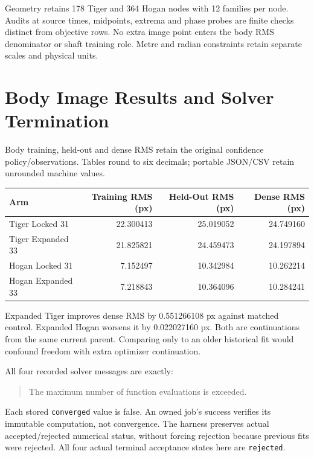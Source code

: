 \documentclass[11pt,letterpaper]{article}
\newcommand{\code}[1]{\nolinkurl{#1}}\newcommand{\hash}[1]{{\footnotesize\nolinkurl{#1}}}
\newcommand{\chapterpage}[1]{\par\clearpage\section{#1}}
\begin{document}
Geometry retains 178 Tiger and 364 Hogan nodes with 12 families per node.
Audits at source times, midpoints, extrema and phase probes are finite checks distinct from objective rows.
No extra image point enters the body RMS denominator or shaft training role.
Metre and radian constraints retain separate scales and physical units.
\chapterpage{Body Image Results and Solver Termination}
Body training, held-out and dense RMS retain the original confidence policy/observations.
Tables round to six decimals; portable JSON/CSV retain unrounded machine values.
\par\smallskip
\begin{tabular}{@{}lrrr@{}}\toprule
Arm & Training RMS (px) & Held-Out RMS (px) & Dense RMS (px)\\\midrule
Tiger Locked 31 & 22.300413 & 25.019052 & 24.749160 \\
Tiger Expanded 33 & 21.825821 & 24.459473 & 24.197894 \\
Hogan Locked 31 & 7.152497 & 10.342984 & 10.262214 \\
Hogan Expanded 33 & 7.218843 & 10.364096 & 10.284241 \\
\bottomrule\end{tabular}\par\smallskip

Expanded Tiger improves dense RMS by 0.551266108 px against matched control.
Expanded Hogan worsens it by 0.022027160 px. Both are continuations from the same current parent.
Comparing only to an older historical fit would confound freedom with extra optimizer continuation.

All four recorded solver messages are exactly:
\begin{quote}\ttfamily The maximum number of function evaluations is exceeded.\end{quote}
Each stored \code{converged} value is false. An owned job's success verifies its immutable
computation, not convergence. The harness preserves actual accepted/rejected numerical status,
without forcing rejection because previous fits were rejected.
All four actual terminal acceptance states here are \code{rejected}.
\end{document}
